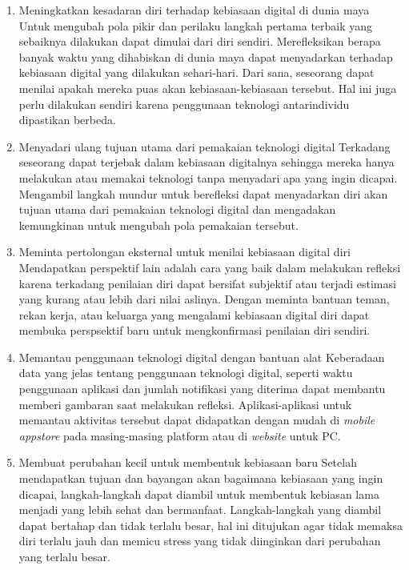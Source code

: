 \begin{enumerate}
  \item Meningkatkan kesadaran diri terhadap kebiasaan digital di dunia maya
  \subitem Untuk mengubah pola pikir dan perilaku langkah pertama terbaik yang sebaiknya dilakukan dapat dimulai dari diri sendiri. Merefleksikan berapa banyak waktu yang dihabiskan di dunia maya dapat menyadarkan terhadap kebiasaan digital yang dilakukan sehari-hari. Dari sana, seseorang dapat menilai apakah mereka puas akan kebiasaan-kebiasaan tersebut. Hal ini juga perlu dilakukan sendiri karena penggunaan teknologi antarindividu dipastikan berbeda.
  
  \item Menyadari ulang tujuan utama dari pemakaian teknologi digital
  \subitem Terkadang seseorang dapat terjebak dalam kebiasaan digitalnya sehingga mereka hanya melakukan atau memakai teknologi tanpa menyadari apa yang ingin dicapai. Mengambil langkah mundur untuk berefleksi dapat menyadarkan diri akan tujuan utama dari pemakaian teknologi digital dan mengadakan kemungkinan untuk mengubah pola pemakaian tersebut.
  
  \item Meminta pertolongan eksternal untuk menilai kebiasaan digital diri
  \subitem Mendapatkan perspektif lain adalah cara yang baik dalam melakukan refleksi karena terkadang penilaian diri dapat bersifat subjektif atau terjadi estimasi yang kurang atau lebih dari nilai aslinya. Dengan meminta bantuan teman, rekan kerja, atau keluarga yang mengalami kebiasaan digital diri dapat membuka perspsektif baru untuk mengkonfirmasi penilaian diri sendiri.
  
  \item Memantau penggunaan teknologi digital dengan bantuan alat
  \subitem Keberadaan data yang jelas tentang penggunaan teknologi digital, seperti waktu penggunaan aplikasi dan jumlah notifikasi yang diterima dapat membantu memberi gambaran saat melakukan refleksi. Aplikasi-aplikasi untuk memantau aktivitas tersebut dapat didapatkan dengan mudah di \textit{mobile appstore} pada masing-masing platform atau di \textit{website} untuk PC.
  
  \item Membuat perubahan kecil untuk membentuk kebiasaan baru
  \subitem Setelah mendapatkan tujuan dan bayangan akan bagaimana kebiasaan yang ingin dicapai, langkah-langkah dapat diambil untuk membentuk kebiasan lama menjadi yang lebih sehat dan bermanfaat. Langkah-langkah yang diambil dapat bertahap dan tidak terlalu besar, hal ini ditujukan agar tidak memaksa diri terlalu jauh dan memicu stress yang tidak diinginkan dari perubahan yang terlalu besar.
  
\end{enumerate}

